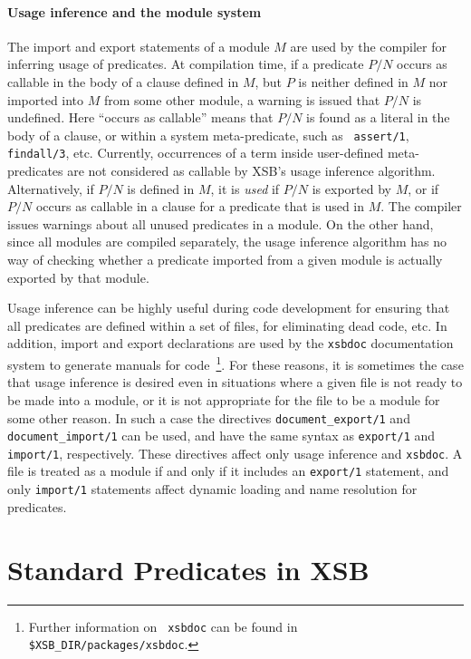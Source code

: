 \paragraph*{Usage inference and the module system}
The import and export statements of a module $M$ are used by the
compiler for inferring usage of predicates.  At compilation time, if a
predicate $P/N$ occurs as callable in the body of a clause defined in
$M$, but $P$ is neither defined in $M$ nor imported into $M$ from some
other module, a warning is issued that $P/N$ is undefined.  Here
``occurs as callable'' means that $P/N$ is found as a literal in the
body of a clause, or within a system meta-predicate, such as {\tt
assert/1}, {\tt findall/3}, etc.  Currently, occurrences of a term
inside user-defined meta-predicates are not considered as callable by
XSB's usage inference algorithm.  Alternatively, if $P/N$ is defined in
$M$, it is {\em used} if $P/N$ is exported by $M$, or if $P/N$ occurs
as callable in a clause for a predicate that is used in $M$.  The
compiler issues warnings about all unused predicates in a module.  On
the other hand, since all modules are compiled separately, the usage
inference algorithm has no way of checking whether a predicate
imported from a given module is actually exported by that module.

Usage inference can be highly useful during code development for
ensuring that all predicates are defined within a set of files, for
eliminating dead code, etc.  In addition, import and export
declarations are used by the {\tt xsbdoc} documentation system to
generate manuals for code~\footnote{Further information on {\tt
xsbdoc} can be found in {\tt \$XSB\_DIR/packages/xsbdoc}.}.  For these
reasons, it is sometimes the case that usage inference is desired even
in situations where a given file is not ready to be made into a
module, or it is not appropriate for the file to be a module for some
other reason.  In such a case the directives {\tt document\_export/1}
and {\tt document\_import/1} can be used, and have the same syntax as 
{\tt export/1} and {\tt import/1}, respectively.  These directives
affect only usage inference and {\tt xsbdoc}.  A file is treated as a
module if and only if it includes an {\tt export/1} statement, and
only {\tt import/1} statements affect dynamic loading and name
resolution for predicates.

\section{Standard Predicates in XSB} \label{sec:standard}

